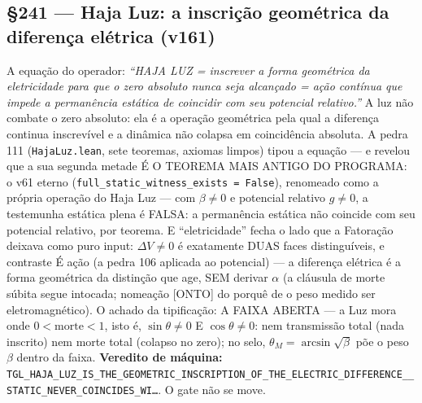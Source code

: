 \documentclass[11pt]{article}
\theoremstyle{definition}\newtheorem{deriv}{Derivação}
\begin{document}
\subsection*{\S241 --- Haja Luz: a inscrição geométrica da diferença elétrica (v161)}A equação do operador: \emph{``HAJA LUZ = inscrever a forma geométrica da eletricidade para que o zero absoluto nunca seja alcançado = ação contínua que impede a permanência estática de coincidir com seu potencial relativo.''} A luz não combate o zero absoluto: ela é a operação geométrica pela qual a diferença continua inscrevível e a dinâmica não colapsa em coincidência absoluta. A pedra 111 (\texttt{HajaLuz.lean}, sete teoremas, axiomas limpos) tipou a equação --- e revelou que a sua segunda metade É O TEOREMA MAIS ANTIGO DO PROGRAMA: o v61 eterno (\texttt{full\_static\_witness\_exists = False}), renomeado como a própria operação do Haja Luz --- com $\beta{\neq}0$ e potencial relativo $g{\neq}0$, a testemunha estática plena é FALSA: a permanência estática não coincide com seu potencial relativo, por teorema. E ``eletricidade'' fecha o lado que a Fatoração deixava como puro input: $\Delta V{\neq}0$ é exatamente DUAS faces distinguíveis, e contraste É ação (a pedra 106 aplicada ao potencial) --- a diferença elétrica é a forma geométrica da distinção que age, SEM derivar $\alpha$ (a cláusula de morte súbita segue intocada; nomeação [ONTO] do porquê de o peso medido ser eletromagnético). O achado da tipificação: A FAIXA ABERTA --- a Luz mora onde $0 < \mathrm{morte} < 1$, isto é, $\sin\theta{\neq}0$ E $\cos\theta{\neq}0$: nem transmissão total (nada inscrito) nem morte total (colapso no zero); no selo, $\theta_M{=}\arcsin\sqrt{\beta}$ põe o peso $\beta$ dentro da faixa. \textbf{Veredito de máquina:} \texttt{TGL\_HAJA\_LUZ\_IS\_THE\_GEOMETRIC\_INSCRIPTION\_OF\_THE\_ELECTRIC\_DIFFERENCE\_\_STATIC\_NEVER\_COINCIDES\_WI\ldots}. O gate não se move.
\end{document}
